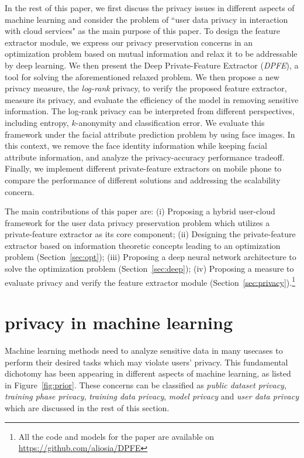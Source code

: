 \documentclass[10pt,journal,compsoc]{IEEEtran}
\begin{document}
In the rest of this paper, we first discuss the privacy issues in different aspects of machine learning and consider the problem of ``user data privacy in interaction with cloud services" as the main purpose of this paper. To design the feature extractor module, we express our privacy preservation concerns in an optimization problem based on mutual information and relax it to be addressable by deep learning. We then present the Deep Private-Feature Extractor (\emph{DPFE}), a tool for solving the aforementioned relaxed problem. We then propose a new privacy measure, the \emph{log-rank} privacy, to verify the proposed feature extractor, measure its privacy, and evaluate the efficiency of the model in removing sensitive information. The log-rank privacy can be interpreted from different perspectives, including entropy, $k$-anonymity and classification error. We evaluate this framework under the facial attribute prediction problem by using face images. In this context, we remove the face identity information while keeping facial attribute information, and analyze the privacy-accuracy performance tradeoff. Finally, we implement different private-feature extractors on mobile phone to compare the performance of different solutions and addressing the scalability concern. 


The main contributions of this paper are: (i) Proposing a hybrid user-cloud framework for the user data privacy preservation problem which utilizes a private-feature extractor as its core component; (ii) Designing the private-feature extractor based on information theoretic concepts leading to an optimization problem (Section~\ref{sec:opt}); (iii)  Proposing a deep neural network architecture to solve the optimization problem (Section~\ref{sec:deep}); (iv) Proposing a measure to evaluate privacy and verify the feature extractor module (Section~\ref{sec:privacy}).\footnote{All the code and models for the paper are available on \url{https://github.com/aliosia/DPFE}}
\section{privacy in machine learning}Machine learning methods need to analyze sensitive data in many usecases to perform their desired tasks which may violate users' privacy. This fundamental dichotomy has been appearing in different aspects of machine learning, as listed in Figure~\ref{fig:prior}. These concerns can be classified as \emph{public dataset privacy}, \emph{training phase privacy}, \emph{training data privacy}, \emph{model privacy} and \emph{user data privacy}  which are discussed in the rest of this section.
\end{document}
